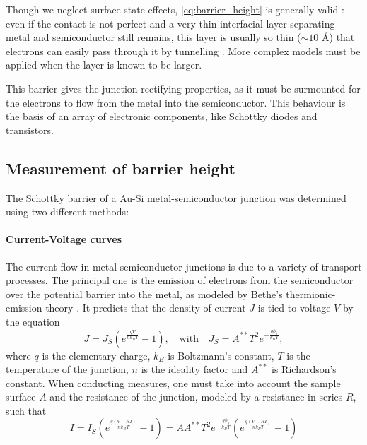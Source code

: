 Though we neglect surface-state effects, \autoref{eq:barrier_height} is generally valid \cite{sze_physics_2007}:
even if the contact is not perfect and a very thin interfacial layer separating metal and semiconductor still remains, this layer is usually so thin ($\sim 10$ \AA) that electrons can easily pass through it by tunnelling \cite{rhoderick_physics_1970}.
More complex models must be applied when the layer is known to be larger.

This barrier gives the junction rectifying properties, as it must be surmounted for the electrons to flow from the metal into the semiconductor.
This behaviour is the basis of an array of electronic components, like Schottky diodes and transistors.

\subsection{Measurement of barrier height}
The Schottky barrier of a Au-Si metal-semiconductor junction was determined using two different methods:

\paragraph{Current-Voltage curves}
The current flow in metal-semiconductor junctions is due to a variety of transport processes.
The principal one is the emission of electrons from the semiconductor over the potential barrier into the metal, as modeled by Bethe's thermionic-emission theory \cite{sze_physics_2007}.
It predicts that the density of current $J$ is tied to voltage $V$ by the equation
\begin{equation} \label{eq:thermionic_emission_current}
    J = J_S \left( e^{\frac{qV}{n k_B T}} - 1 \right), \quad \text{{with}} \quad J_S = A^{**} T^2 e^{-\frac{q \phi_b}{k_B T}},
\end{equation}
where $q$ is the elementary charge, $k_B$ is Boltzmann's constant, $T$ is the temperature of the junction, $n$ is the ideality factor and $A^{**}$ is Richardson's constant.
When conducting measures, one must take into account the sample surface $A$ and the resistance of the junction, modeled by a resistance in series $R$, such that
\begin{equation} \label{eq:iv_curve}
    I = I_S \left( e^{\frac{q (V- RI)}{n k_B T}} - 1\right) = A A^{**} T^2 e^{-\frac{q\phi_b}{k_BT}} \left( e^{\frac{q (V- RI)}{n k_B T}} - 1\right)
\end{equation}

